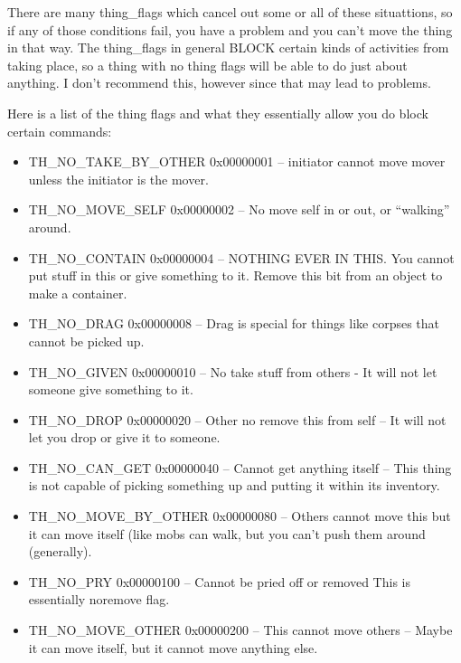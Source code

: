 There are many thing\_flags which cancel out some or all of these situattions, so if any of those conditions fail, you have a problem and you can't move the thing in that way. The thing\_flags in general BLOCK certain kinds of activities from taking place, so a thing with no thing flags will be able to do just about anything. I don't recommend this, however since that may lead to problems. 

Here is a list of the thing flags and what they essentially allow you do block certain commands:

\begin{itemize}

\item TH\_NO\_TAKE\_BY\_OTHER 0x00000001    -- initiator cannot move mover unless the initiator is the mover. 

\item TH\_NO\_MOVE\_SELF     0x00000002   -- No move self in or out, or ``walking'' around.

\item TH\_NO\_CONTAIN       0x00000004   -- NOTHING EVER IN THIS. You cannot put stuff in this or give something to it. Remove this bit from an object to make a container.

\item TH\_NO\_DRAG          0x00000008   -- Drag is special for things like corpses that cannot be picked up.

\item TH\_NO\_GIVEN         0x00000010   -- No take stuff from others - It will not let someone give something to it. 

\item TH\_NO\_DROP          0x00000020   -- Other no remove this from self -- It will not let you drop or give it to someone.

\item TH\_NO\_CAN\_GET       0x00000040   -- Cannot get anything itself -- This thing is not capable of picking something up and putting it within its inventory. 

\item TH\_NO\_MOVE\_BY\_OTHER 0x00000080   -- Others cannot move this but it can move itself (like mobs can walk, but you can't push them around (generally). 

\item TH\_NO\_PRY           0x00000100   -- Cannot be pried off or removed This is essentially noremove flag.

\item TH\_NO\_MOVE\_OTHER    0x00000200   -- This cannot move others -- Maybe it can move itself, but it cannot move anything else.


\end{itemize}
